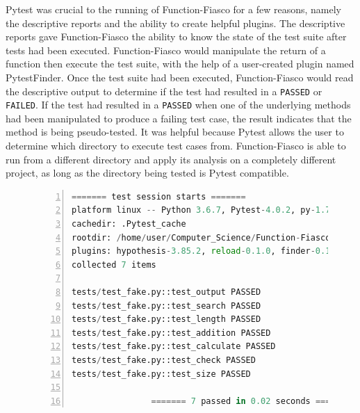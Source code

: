 Pytest was crucial to the running of Function-Fiasco for a few reasons, namely the descriptive reports and the ability to create helpful plugins. The descriptive reports gave Function-Fiasco the ability to know the state of the test suite after tests had been executed. Function-Fiasco would manipulate the return of a function then execute the test suite, with the help of a user-created plugin named PytestFinder. Once the test suite had been executed, Function-Fiasco would read the descriptive output to determine if the test had resulted in a \texttt{PASSED} or \texttt{FAILED}. If the test had resulted in a \texttt{PASSED} when one of the underlying methods had been manipulated to produce a failing test case, the result indicates that the method is being pseudo-tested. It was helpful because Pytest allows the user to determine which directory to execute test cases from. Function-Fiasco is able to run from a different directory and apply its analysis on a completely different project, as long as the directory being tested is Pytest compatible.

\begin{figure}[t!]
\begin{lstlisting}[language = Python, numbers = left, frame = single, caption = Example of a Pytest Execution., label = PytestExample]
                ======= test session starts =======
platform linux -- Python 3.6.7, Pytest-4.0.2, py-1.7.0, pluggy-0.8.0 -- /usr/bin/python3
cachedir: .Pytest_cache
rootdir: /home/user/Computer_Science/Function-Fiasco/fake, inifile:
plugins: hypothesis-3.85.2, reload-0.1.0, finder-0.1.0
collected 7 items

tests/test_fake.py::test_output PASSED                   [ 14%]
tests/test_fake.py::test_search PASSED                   [ 28%]
tests/test_fake.py::test_length PASSED                   [ 42%]
tests/test_fake.py::test_addition PASSED                 [ 57%]
tests/test_fake.py::test_calculate PASSED                [ 71%]
tests/test_fake.py::test_check PASSED                    [ 85%]
tests/test_fake.py::test_size PASSED                     [100%]

                ======= 7 passed in 0.02 seconds =======
\end{lstlisting}
\end{figure}

